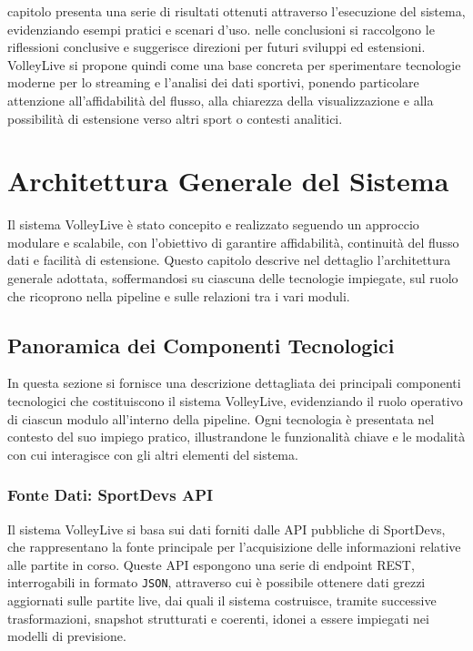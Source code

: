 \documentclass[a4paper,12pt]{report}
\begin{document}
capitolo presenta una serie di risultati ottenuti attraverso l’esecuzione del sistema, evidenziando esempi pratici e scenari d’uso. nelle conclusioni si raccolgono le riflessioni conclusive e suggerisce direzioni per futuri sviluppi ed estensioni. VolleyLive si propone quindi come una base concreta per sperimentare tecnologie moderne per lo streaming e l’analisi dei dati sportivi, ponendo particolare attenzione all’affidabilità del flusso, alla chiarezza della visualizzazione e alla possibilità di estensione verso altri sport o contesti analitici.


\chapter{Architettura Generale del Sistema}

Il sistema VolleyLive è stato concepito e realizzato seguendo un approccio modulare e scalabile, con l’obiettivo di garantire affidabilità, continuità del flusso dati e facilità di estensione. Questo capitolo descrive nel dettaglio l’architettura generale adottata, soffermandosi su ciascuna delle tecnologie impiegate, sul ruolo che ricoprono nella pipeline e sulle relazioni tra i vari moduli.


\section{Panoramica dei Componenti Tecnologici}

In questa sezione si fornisce una descrizione dettagliata dei principali componenti tecnologici che costituiscono il sistema VolleyLive, evidenziando il ruolo operativo di ciascun modulo all’interno della pipeline. Ogni tecnologia è presentata nel contesto del suo impiego pratico, illustrandone le funzionalità chiave e le modalità con cui interagisce con gli altri elementi del sistema.


\subsection{Fonte Dati: SportDevs API}

Il sistema VolleyLive si basa sui dati forniti dalle API pubbliche di SportDevs, che rappresentano la fonte principale per l’acquisizione delle informazioni relative alle partite in corso. Queste API espongono una serie di endpoint REST, interrogabili in formato \texttt{JSON}, attraverso cui è possibile ottenere dati grezzi aggiornati sulle partite live, dai quali il sistema costruisce, tramite successive trasformazioni, snapshot strutturati e coerenti, idonei a essere impiegati nei modelli di previsione.
\end{document}
